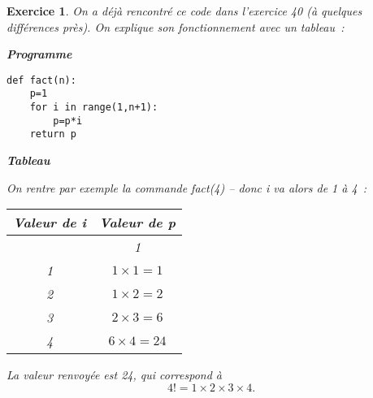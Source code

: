 \documentclass[10pt]{article}
\newtheorem{exo}{Exercice}
\begin{document}
\begin{exo}

On a déjà rencontré ce code dans l'exercice 40 (à quelques différences près). On explique son fonctionnement avec un tableau~:

\medskip

\setlength{\columnseprule}{1pt}

\begin{multicols}{2}

\begin{center}
\textbf{Programme}
\end{center}

\begin{lstlisting}
def fact(n):
	p=1
	for i in range(1,n+1):
		p=p*i
	return p
\end{lstlisting}



\vspace*{0.5cm}

\columnbreak

\begin{center}
\textbf{Tableau}
\end{center}

\medskip

On rentre par exemple la commande fact(4) -- donc i va alors de 1 à 4~:


\begin{center}


\begin{tabular}{|c|c|} \hline
\textbf{Valeur de i}& \textbf{Valeur de p}\\ \hline
\cellcolor{gray}& 1\\ \hline
1& $1\times 1=1$\\ \hline
2&$1\times 2=2$\\ \hline
3&$2\times 3=6$\\ \hline
4&$6\times 4=24$ \\ \hline
\end{tabular}
\end{center}

\end{multicols}

\medskip

La valeur renvoyée est 24, qui correspond à 
\[4!=1\times 2\times 3\times 4.\]




\end{exo}
\end{document}
